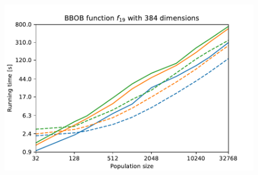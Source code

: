 \begin{figure}[ht!]
\begin{minipage}[t]{0.32\textwidth}
    \end{minipage}
    \hfill
    \begin{minipage}[t]{0.32\textwidth}
        \centering
        \includegraphics[width=\textwidth]{img/runs/time_es_schema_fn19_384d.pdf}
    \end{minipage}


\end{figure}
